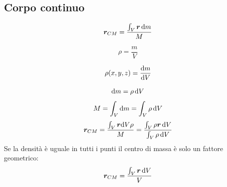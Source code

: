 \subsection{Corpo continuo}
\begin{Def}
\begin{equation}\boldsymbol{r}_{CM}=\frac{\int_V \boldsymbol{r}\,\mathrm{d} m}{M}\end{equation}
\end{Def}
\begin{Def}
 \begin{equation}\rho =\frac{m}{V}\end{equation}
\end{Def}
\begin{Def}
 \begin{equation}\rho(x,y,z)=\frac{\mathrm{d} m}{\mathrm{d} V}\end{equation}
\end{Def}
\begin{equation*}\mathrm{d} m=\rho\,\mathrm{d} V\end{equation*}
\begin{equation*}M=\int_V \mathrm{d} m=\int_V\rho \,\mathrm{d} V\end{equation*}
\begin{equation}\boldsymbol{r}_{CM}=\frac{\int_V \boldsymbol{r} \mathrm{d} V\rho}{M}=\frac{\int_V\rho\boldsymbol{r}\,\mathrm{d} V}{\int_V \rho \,\mathrm{d} V}\end{equation}
Se la densità è uguale in tutti i punti il centro di massa è solo un fattore geometrico:
\begin{equation*}\boldsymbol{r}_{CM}=\frac{\int_V\boldsymbol{r}\,\mathrm{d} V}{V}\end{equation*}

